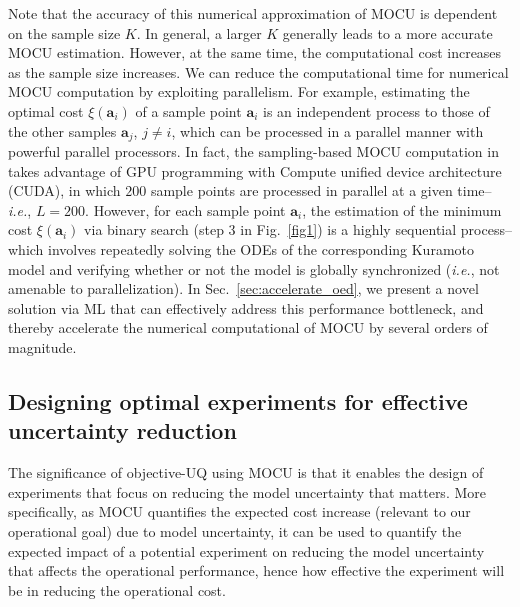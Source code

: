\documentclass{article}
\begin{document}
Note that the accuracy of this numerical approximation of MOCU is dependent on the sample size ${K}$. In general, a larger $K$ generally leads to a more accurate MOCU estimation. However, at the same time, the computational cost increases as the sample size increases. We can reduce the computational time for numerical MOCU computation by exploiting parallelism. For example, estimating the optimal cost ${\xi\left( \mathbf{a}_i\right)}$ of a sample point ${\mathbf{a}_i}$ is an independent process to those of the other samples ${\mathbf{a}_j}$, ${j\neq i}$, which can be processed in a parallel manner with powerful parallel processors. In fact, the sampling-based MOCU computation in~\cite{Hong2021} takes advantage of GPU programming with Compute uniﬁed device architecture (CUDA), in which ${200}$ sample points are processed in parallel at a given time--\textit{i.e.}, ${L=200}$. However, for each sample point ${\mathbf{a}_i}$, the estimation of the minimum cost ${\xi\left( \mathbf{a}_i\right)}$ via binary search (step 3 in Fig.~\ref{fig1}) is a highly sequential process--which involves repeatedly solving the ODEs of the corresponding Kuramoto model and verifying whether or not the model is globally synchronized (\textit{i.e.}, not amenable to parallelization). In Sec.~\ref{sec:accelerate_oed}, we present a novel solution via ML that can effectively address this performance bottleneck, and thereby accelerate the numerical computational of MOCU by several orders of magnitude. 


\subsection{Designing optimal experiments for effective uncertainty reduction}

The significance of objective-UQ using MOCU is that it enables the design of experiments that focus on reducing the model uncertainty that matters. More specifically, as MOCU quantifies the expected cost increase (relevant to our operational goal) due to model uncertainty, it can be used to quantify the expected impact of a potential experiment on reducing the model uncertainty that affects the operational performance, hence how effective the experiment will be in reducing the operational cost. 
\end{document}
